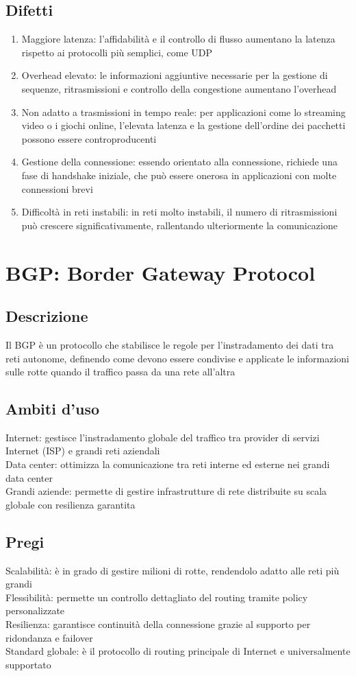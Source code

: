 \documentclass[10pt,oneside,a4paper]{article}
\begin{document}
\subsection{Difetti}
\begin{enumerate}
\item Maggiore latenza: l'affidabilità e il controllo di flusso aumentano la latenza rispetto ai protocolli più semplici, come UDP
\item Overhead elevato: le informazioni aggiuntive necessarie per la gestione di sequenze, ritrasmissioni e controllo della congestione aumentano l'overhead
\item Non adatto a trasmissioni in tempo reale: per applicazioni come lo streaming video o i giochi online, l'elevata latenza e la gestione dell'ordine dei pacchetti possono essere controproducenti
\item Gestione della connessione: essendo orientato alla connessione, richiede una fase di handshake iniziale, che può essere onerosa in applicazioni con molte connessioni brevi
\item Difficoltà in reti instabili: in reti molto instabili, il numero di ritrasmissioni può crescere significativamente, rallentando ulteriormente la comunicazione
\end{enumerate}
\section{BGP: Border Gateway Protocol}
\subsection{Descrizione}
Il BGP è un protocollo che stabilisce le regole per l'instradamento dei dati tra reti autonome, definendo come devono essere condivise e applicate le informazioni sulle rotte quando il traffico passa da una rete all'altra
\subsection{Ambiti d'uso}
Internet: gestisce l'instradamento globale del traffico tra provider di servizi Internet (ISP) e grandi reti aziendali\\
Data center: ottimizza la comunicazione tra reti interne ed esterne nei grandi data center\\
Grandi aziende: permette di gestire infrastrutture di rete distribuite su scala globale con resilienza garantita
\subsection{Pregi}
Scalabilità: è in grado di gestire milioni di rotte, rendendolo adatto alle reti più grandi\\
Flessibilità: permette un controllo dettagliato del routing tramite policy personalizzate\\
Resilienza: garantisce continuità della connessione grazie al supporto per ridondanza e failover\\
Standard globale: è il protocollo di routing principale di Internet e universalmente supportato
\end{document}
